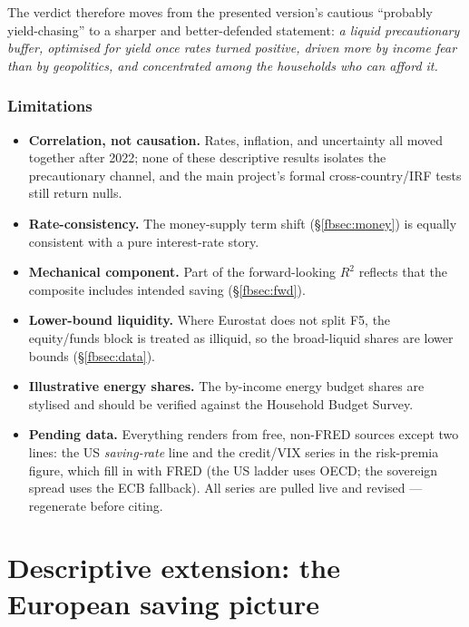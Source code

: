 \documentclass[11pt,a4paper]{article}
\begin{document}
The verdict therefore moves from the presented version's cautious ``probably
yield-chasing'' to a sharper and better-defended statement: \emph{a liquid
precautionary buffer, optimised for yield once rates turned positive, driven more
by income fear than by geopolitics, and concentrated among the households who can
afford it.}

\section{Limitations}\label{fbsec:limits}
\begin{itemize}
  \item \textbf{Correlation, not causation.} Rates, inflation, and uncertainty
  all moved together after 2022; none of these descriptive results isolates the
  precautionary channel, and the main project's formal cross-country/IRF tests
  still return nulls.
  \item \textbf{Rate-consistency.} The money-supply term shift (\S\ref{fbsec:money})
  is equally consistent with a pure interest-rate story.
  \item \textbf{Mechanical component.} Part of the forward-looking $R^2$ reflects
  that the composite includes intended saving (\S\ref{fbsec:fwd}).
  \item \textbf{Lower-bound liquidity.} Where Eurostat does not split F5, the
  equity/funds block is treated as illiquid, so the broad-liquid shares are lower
  bounds (\S\ref{fbsec:data}).
  \item \textbf{Illustrative energy shares.} The by-income energy budget shares
  are stylised and should be verified against the Household Budget Survey.
  \item \textbf{Pending data.} Everything renders from free, non-FRED sources
  except two lines: the US \emph{saving-rate} line and the credit/VIX series in the
  risk-premia figure, which fill in with FRED (the US ladder uses OECD; the
  sovereign spread uses the ECB fallback). All series are pulled live and revised
  --- regenerate before citing.
\end{itemize}


\clearpage
\part{Descriptive extension: the European saving picture}
\end{document}
